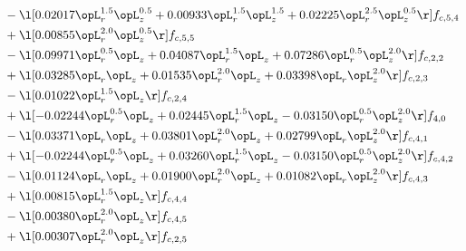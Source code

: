 \begin{alignat}{2}
& - \l[  0.02017 \opL_r^{1.5} \opL_z^{0.5} +  0.00933 \opL_r^{1.5} \opL_z^{1.5} +  0.02225 \opL_r^{2.5} \opL_z^{0.5}  \r] f_{c,5,4} \nonumber \\ 
& + \l[  0.00855 \opL_r^{2.0} \opL_z^{0.5}  \r] f_{c,5,5} \nonumber \\ 
& - \l[  0.09971 \opL_r^{0.5} \opL_z +  0.04087 \opL_r^{1.5} \opL_z +  0.07286 \opL_r^{0.5} \opL_z^{2.0}  \r] f_{c,2,2} \nonumber \\ 
& + \l[  0.03285 \opL_r \opL_z +  0.01535 \opL_r^{2.0} \opL_z +  0.03398 \opL_r \opL_z^{2.0}  \r] f_{c,2,3} \nonumber \\ 
& - \l[  0.01022 \opL_r^{1.5} \opL_z  \r] f_{c,2,4} \nonumber \\ 
& + \l[  -0.02244 \opL_r^{0.5} \opL_z +  0.02445 \opL_r^{1.5} \opL_z   -0.03150 \opL_r^{0.5} \opL_z^{2.0}  \r] f_{4,0} \nonumber \\ 
& - \l[  0.03371 \opL_r \opL_z +  0.03801 \opL_r^{2.0} \opL_z +  0.02799 \opL_r \opL_z^{2.0}  \r] f_{c,4,1} \nonumber \\ 
& + \l[  -0.02244 \opL_r^{0.5} \opL_z +  0.03260 \opL_r^{1.5} \opL_z   -0.03150 \opL_r^{0.5} \opL_z^{2.0}  \r] f_{c,4,2} \nonumber \\ 
& - \l[  0.01124 \opL_r \opL_z +  0.01900 \opL_r^{2.0} \opL_z +  0.01082 \opL_r \opL_z^{2.0}  \r] f_{c,4,3} \nonumber \\ 
& + \l[  0.00815 \opL_r^{1.5} \opL_z  \r] f_{c,4,4} \nonumber \\ 
& - \l[  0.00380 \opL_r^{2.0} \opL_z  \r] f_{c,4,5} \nonumber \\ 
& + \l[  0.00307 \opL_r^{2.0} \opL_z  \r] f_{c,2,5} \nonumber \\ 
\end{alignat} 


